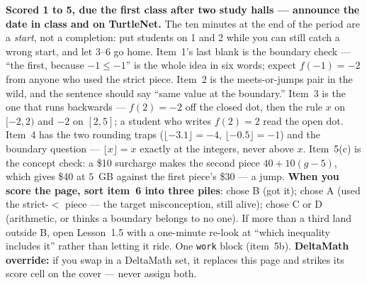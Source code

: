 \documentclass[10pt]{article}
\begin{document}
\begin{teachernote}[Homework]
\textbf{Scored 1 to 5, due the first class after two study halls --- announce the date in class and on
TurtleNet.} The ten minutes at the end of the period are a \emph{start}, not a completion: put
students on 1 and 2 while you can still catch a wrong start, and let 3--6 go home. Item~1's last
blank is the boundary check --- ``the first, because $-1\le-1$'' is the whole idea in six words;
expect $f(-1)=-2$ from anyone who used the strict piece. Item~2 is the meets-or-jumps pair in the
wild, and the sentence should say ``same value at the boundary.'' Item~3 is the one that runs
backwards --- $f(2)=-2$ off the closed dot, then the rule $x$ on $[-2,2)$ and $-2$ on $[2,5]$;
a student who writes $f(2)=2$ read the open dot. Item~4 has the two rounding traps
($\lfloor-3.1\rfloor=-4$, $\lfloor-0.5\rfloor=-1$) and the boundary question ---
$\lfloor x\rfloor=x$ exactly at the integers, never above $x$. Item~5(c) is the concept check: a
\$10 surcharge makes the second piece $40+10(g-5)$, which gives \$40 at $5$~GB against the first
piece's \$30 --- a jump. \textbf{When you score the page, sort item~6 into three piles}: chose B
(got it); chose A (used the strict-$<$ piece --- the target misconception, still alive); chose C
or D (arithmetic, or thinks a boundary belongs to no one). If more than a third land outside B,
open Lesson~1.5 with a one-minute re-look at ``which inequality includes it'' rather than letting
it ride. One \texttt{work} block (item~5b). \textbf{DeltaMath override:} if you swap in a
DeltaMath set, it replaces this page and strikes its score cell on the cover --- never assign both.
\end{teachernote}
\end{document}
